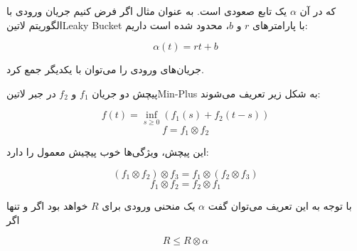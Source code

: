 که در آن $\alpha$ یک تابع صعودی است. به عنوان مثال اگر فرض کنیم جریان ورودی با الگوریتم ‌لاتین{Leaky Bucket} با پارامترهای $r$ و $b$، محدود شده است داریم:

\[
  \alpha(t) = rt + b
\]

جریان‌های ورودی را می‌توان با یکدیگر جمع کرد.


پیچش دو جریان $f_{1}$ و $f_{2}$ در جبر ‌لاتین{Min-Plus} به شکل زیر تعریف می‌شوند:

\[
  f(t) = \inf_{s \ge 0}(f_{1}(s) + f_{2}(t-s))
\]
\[
  f = f_{1} \otimes f_{2}
\]

این پیچش، ویژگی‌ها خوب پیچیش معمول را دارد:

\[
  (f_{1} \otimes f_{2}) \otimes f_{3} = f_{1} \otimes (f_{2} \otimes f_{3})
\]
\[
  f_{1} \otimes f_{2} = f_{2} \otimes f_{1}
\]

با توجه به این تعریف می‌توان گفت $\alpha$ یک منحنی ورودی برای $R$ خواهد بود اگر و تنها اگر

\[
  R \le R \otimes \alpha
\]
